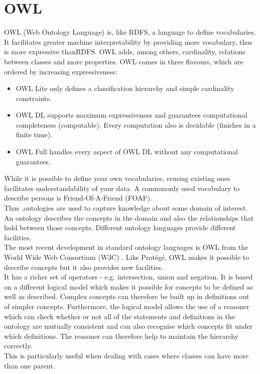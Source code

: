 \documentclass[a4paper,12pt,oneside]{report}
\begin{document}
{{{\section{OWL}
{ OWL  (Web Ontology Language) is, like RDFS, a language to define vocabularies. It facilitates greater machine interpretability by providing more vocabulary, thus is more expressive thanRDFS. OWL adds, among others, cardinality, relations between classes and more properties.
OWL comes in three flavours, which are ordered by increasing expressiveness:
\begin{itemize}
\item {OWL Lite only defines a classification hierarchy and simple cardinality constraints. }
\item { OWL DL supports maximum expressiveness and guarantees computational completeness
(computable). Every computation also is decidable (finishes in a finite time).}
\item { OWL Full handles every aspect of OWL DL without any computational guarantees.}
\end{itemize}
While it is possible to define your own vocabularies, reusing existing ones facilitates understandability of your data. A commmonly used vocabulary to describe persons is Friend-Of-A-Friend (FOAF).\\
Thus ,ontologies are used to capture knowledge about some domain of interest. An ontology describes the concepts in the domain and also the relationships that hold between those concepts. Different ontology languages provide different facilities.\\
 The most recent development in standard ontology languages is OWL from the World Wide Web Consortium (W3C) . Like Protégé, OWL makes it possible to describe concepts but it also provides new facilities.\\
 It has a richer set of operators - e.g. intersection, union and negation. It is based on a different logical model which makes it possible for concepts to be defined as well as described. Complex concepts can therefore be built up in definitions out of simpler concepts. Furthermore, the logical model allows the use of a reasoner which can check whether or not all of the statements and definitions in the ontology are mutually consistent and can also recognise which concepts fit under which definitions. The reasoner can therefore help to maintain the hierarchy correctly.\\
 This is particularly useful when dealing with cases where classes can have more than one parent.}
}}}
\end{document}
